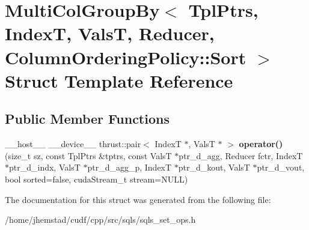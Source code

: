 \hypertarget{structMultiColGroupBy_3_01TplPtrs_00_01IndexT_00_01ValsT_00_01Reducer_00_01ColumnOrderingPolicy_1_1Sort_01_4}{}\section{Multi\+Col\+Group\+By$<$ Tpl\+Ptrs, IndexT, ValsT, Reducer, Column\+Ordering\+Policy\+:\+:Sort $>$ Struct Template Reference}
\label{structMultiColGroupBy_3_01TplPtrs_00_01IndexT_00_01ValsT_00_01Reducer_00_01ColumnOrderingPolicy_1_1Sort_01_4}
\subsection*{Public Member Functions}
\begin{DoxyCompactItemize}
\item 
\+\_\+\+\_\+host\+\_\+\+\_\+ \+\_\+\+\_\+device\+\_\+\+\_\+ thrust\+::pair$<$ IndexT $\ast$, ValsT $\ast$ $>$ {\bfseries operator()} (size\+\_\+t sz, const Tpl\+Ptrs \&tptrs, const ValsT $\ast$ptr\+\_\+d\+\_\+agg, Reducer fctr, IndexT $\ast$ptr\+\_\+d\+\_\+indx, ValsT $\ast$ptr\+\_\+d\+\_\+agg\+\_\+p, IndexT $\ast$ptr\+\_\+d\+\_\+kout, ValsT $\ast$ptr\+\_\+d\+\_\+vout, bool sorted=false, cuda\+Stream\+\_\+t stream=N\+U\+LL)\hypertarget{structMultiColGroupBy_3_01TplPtrs_00_01IndexT_00_01ValsT_00_01Reducer_00_01ColumnOrderingPolicy_1_1Sort_01_4_a8833995d3829fe45e526972487939a58}{}\label{structMultiColGroupBy_3_01TplPtrs_00_01IndexT_00_01ValsT_00_01Reducer_00_01ColumnOrderingPolicy_1_1Sort_01_4_a8833995d3829fe45e526972487939a58}

\end{DoxyCompactItemize}


The documentation for this struct was generated from the following file\+:\begin{DoxyCompactItemize}
\item 
/home/jhemstad/cudf/cpp/src/sqls/sqls\+\_\+set\+\_\+ops.\+h\end{DoxyCompactItemize}
